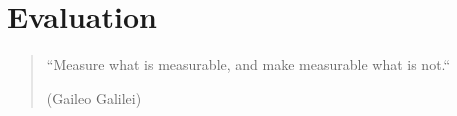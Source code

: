 
\chapter{Evaluation} \label{chapter:evaluation}

\begin{quotation}
``Measure what is measurable, and make measurable what is not.``
\begin{flushright}
(Gaileo Galilei)
\end{flushright}
\end{quotation}
